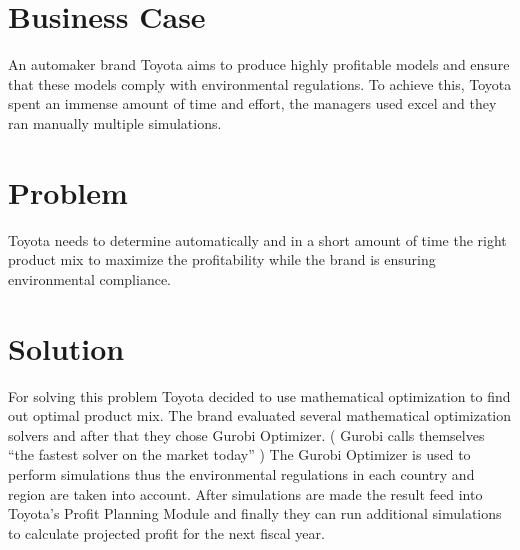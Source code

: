 \documentclass[
  letterpaper,
  DIV=11,
  numbers=noendperiod]{scrreprt}
\begin{document}
\hypertarget{business-case}{%
\section{Business Case}\label{business-case}}

An automaker brand Toyota aims to produce highly profitable models and
ensure that these models comply with environmental regulations. To
achieve this, Toyota spent an immense amount of time and effort, the
managers used excel and they ran manually multiple simulations.

\hypertarget{problem}{%
\section{Problem}\label{problem}}

Toyota needs to determine automatically and in a short amount of time
the right product mix to maximize the profitability while the brand is
ensuring environmental compliance.

\hypertarget{solution}{%
\section{Solution}\label{solution}}

For solving this problem Toyota decided to use mathematical optimization
to find out optimal product mix. The brand evaluated several
mathematical optimization solvers and after that they chose Gurobi
Optimizer. ( Gurobi calls themselves ``the fastest solver on the market
today'' ) The Gurobi Optimizer is used to perform simulations thus the
environmental regulations in each country and region are taken into
account. After simulations are made the result feed into Toyota's Profit
Planning Module and finally they can run additional simulations to
calculate projected profit for the next fiscal year.
\end{document}
